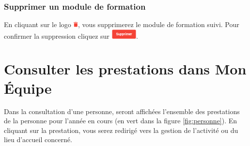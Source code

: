 \subsubsection{Supprimer un module de formation}
En cliquant sur le logo \includegraphics[height=0.3cm]{Images/icon/icon-del.png}, vous supprimerez le module de formation suivi. Pour confirmer la suppression cliquez sur \includegraphics[height=0.5cm]{Images/icon/button-supprimer.png}.



\section{Consulter les prestations dans Mon Équipe}

Dans la consultation d'une personne, seront affichées l'ensemble des prestations de la personne pour l'année en cours (en \textcolor{vert}{vert} dans la figure \ref{fig:personne}). En cliquant sur la prestation, vous serez redirigé vers la gestion de l'activité ou du lieu d'accueil concerné. 